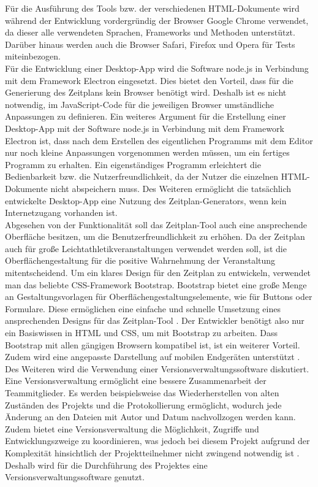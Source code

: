 Für die Ausführung des Tools bzw. der verschiedenen HTML-Dokumente wird während der Entwicklung vordergründig der Browser Google Chrome verwendet, da dieser alle verwendeten Sprachen, Frameworks und Methoden unterstützt. Darüber hinaus werden auch die Browser Safari, Firefox und Opera für Tests miteinbezogen.\\
Für die Entwicklung einer Desktop-App wird die Software node.js in Verbindung mit dem Framework Electron eingesetzt. Dies bietet den Vorteil, dass für die Generierung des Zeitplans kein Browser benötigt wird. Deshalb ist es nicht notwendig, im JavaScript-Code für die jeweiligen Browser umständliche Anpassungen zu definieren. Ein weiteres Argument für die Erstellung einer Desktop-App mit der Software node.js in Verbindung mit dem Framework Electron ist, dass nach dem Erstellen des eigentlichen Programms mit dem Editor nur noch kleine Anpassungen vorgenommen werden müssen, um ein fertiges Programm zu erhalten. Ein eigenständiges Programm erleichtert die Bedienbarkeit bzw. die Nutzerfreundlichkeit, da der Nutzer die einzelnen HTML-Dokumente nicht abspeichern muss. Des Weiteren ermöglicht die tatsächlich entwickelte Desktop-App eine Nutzung des Zeitplan-Generators, wenn kein Internetzugang vorhanden ist. \\
Abgesehen von der Funktionalität soll das Zeitplan-Tool auch eine ansprechende Oberfläche besitzen, um die Benutzerfreundlichkeit zu erhöhen. Da der Zeitplan auch für große Leichtathletikveranstaltungen verwendet werden soll, ist die Oberflächengestaltung für die positive Wahrnehmung der Veranstaltung mitentscheidend. Um ein klares Design für den Zeitplan zu entwickeln, verwendet man das beliebte \ac{CSS}-Framework Bootstrap. Bootstrap bietet eine große Menge an Gestaltungsvorlagen für Oberflächengestaltungselemente, wie für Buttons oder Formulare. Diese ermöglichen eine einfache und schnelle Umsetzung eines ansprechenden Designs für das Zeitplan-Tool \cite{bootstrap}.
 Der Entwickler benötigt also nur ein Basiswissen in HTML und CSS, um mit Bootstrap zu arbeiten. Dass Bootstrap mit allen gängigen Browsern kompatibel ist, ist ein weiterer Vorteil. Zudem wird eine angepasste Darstellung auf mobilen Endgeräten unterstützt \cite{bootstrap2}.\\
Des Weiteren wird die Verwendung einer Versionsverwaltungssoftware diskutiert. Eine Versionsverwaltung ermöglicht eine bessere Zusammenarbeit der Teammitglieder. Es werden beispielsweise das Wiederherstellen von alten Zuständen des Projekts und die Protokollierung ermöglicht, wodurch jede Änderung an den Dateien mit Autor und Datum nachvollzogen werden kann.  Zudem bietet eine Versionsverwaltung die Möglichkeit, Zugriffe und Entwicklungszweige zu koordinieren, was jedoch bei diesem Projekt aufgrund der Komplexität hinsichtlich der Projektteilnehmer nicht zwingend notwendig ist \cite{git}. Deshalb wird für die Durchführung des Projektes eine Versionsverwaltungssoftware genutzt.
